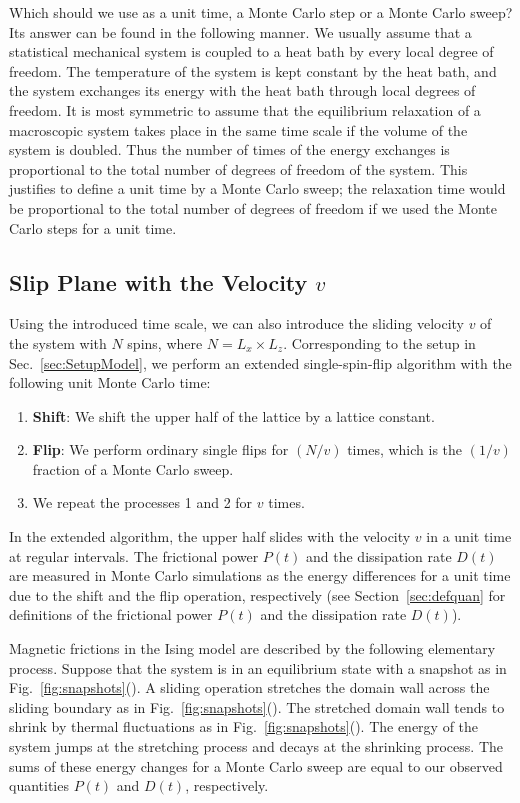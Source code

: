 Which should we use as a unit time, a Monte Carlo step or a Monte Carlo sweep? Its answer can be found in the following manner. We usually assume that a statistical mechanical system is coupled to a heat bath by every local degree of freedom. The temperature of the system is kept constant by the heat bath, and the system exchanges its energy with the heat bath through local degrees of freedom. It is most symmetric to assume that the equilibrium relaxation of a macroscopic system takes place in the same time scale if the volume of the system is doubled. Thus the number of times of the energy exchanges is proportional to the total number of degrees of freedom of the system. This justifies to define a unit time by a Monte Carlo sweep; the relaxation time would be proportional to the total number of degrees of freedom if we used the Monte Carlo steps for a unit time.

\subsection{Slip Plane with the Velocity $v$}\label{subsec:SlipPlaneWithV}
Using the introduced time scale, we can also introduce the sliding velocity $v$ of the system with $N$ spins, where $N=L_{x}\times L_{z}$. Corresponding to the setup in Sec.~\ref{sec:SetupModel}, we perform an extended single-spin-flip algorithm with the following unit Monte Carlo time:
\begin{enumerate}
	\item \textbf{Shift}: We shift the upper half of the lattice by a lattice constant.
	\item \textbf{Flip}: We perform ordinary single flips for $(N/v)$ times, which is the $(1/v)$ fraction of a Monte Carlo sweep.
	\item We repeat the processes 1 and 2 for $v$ times.
\end{enumerate}
In the extended algorithm, the upper half slides with the velocity $v$ in a unit time at regular intervals. The frictional power $P(t)$ and the dissipation rate $D(t)$ are measured in Monte Carlo simulations as the energy differences for a unit time due to the shift and the flip operation, respectively (see Section~\ref{sec:defquan} for definitions of the frictional power $P(t)$ and the dissipation rate $D(t)$).

Magnetic frictions in the Ising model are described by the following elementary process. Suppose that the system is in an equilibrium state with a snapshot as in Fig.~\ref{fig:snapshots}(). A sliding operation stretches the domain wall across the sliding boundary as in Fig.~\ref{fig:snapshots}(). The stretched domain wall tends to shrink by thermal fluctuations as in Fig.~\ref{fig:snapshots}(). The energy of the system jumps at the stretching process and decays at the shrinking process. The sums of these energy changes for a Monte Carlo sweep are equal to our observed quantities $P(t)$ and $D(t)$, respectively.

